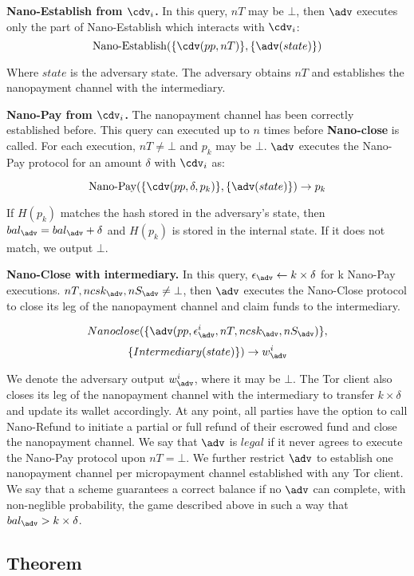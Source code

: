 \textbf{Nano-Establish from $\cdv_i$.}
In this query, $nT$ may be $\bot$, then $\adv$ executes only the part of Nano-Establish which interacts with $\cdv_i$: $$\operatorname{Nano-Establish}(\{\cdv(pp, nT)\}, \{\adv(state)\})$$

Where $state$ is the adversary state.
The adversary obtains $nT$ and establishes the nanopayment channel with the intermediary.

\textbf{Nano-Pay from $\cdv_i$.}
The nanopayment channel has been correctly established before.
This query can executed up to $n$ times before \textbf{Nano-close} is called.
For each execution, $nT \neq \bot$ and $p_k$ may be $\bot$.
$\adv$ executes the Nano-Pay protocol for an amount $\delta$ with $\cdv_i$ as:

$$\operatorname{Nano-Pay}(\{\cdv(pp,\delta,p_k)\},\{\adv(state)\}) \rightarrow p_k$$

If $H(p_k)$ matches the hash stored in the adversary's state, then $bal_\adv = bal_\adv+\delta$ and $H(p_k)$ is stored in the internal state.
If it does not match, we output $\bot$.

\textbf{Nano-Close with intermediary.}
In this query, $\epsilon_\adv \leftarrow k \times \delta$ for k Nano-Pay executions.
$nT, ncsk_\adv, nS_\adv \neq \bot$, then $\adv$ executes the Nano-Close protocol to close its leg of the nanopayment channel and claim funds to the intermediary.

$$Nano\-close(\{\adv(pp, \epsilon^i_\adv, nT, ncsk_\adv, nS_\adv)\},$$ $$\{Intermediary(state)\}) \rightarrow w^i_\adv$$

We denote the adversary output $w^i_\adv$, where it may be $\bot$.
The Tor client also closes its leg of the nanopayment channel with the intermediary to transfer $k \times \delta$ and update its wallet accordingly.
At any point, all parties have the option to call Nano-Refund to initiate a partial or full refund of their escrowed fund and close the nanopayment channel.
We say that $\adv$ is $legal$ if it never agrees to execute the Nano-Pay protocol upon $nT = \bot$.
We further restrict $\adv$ to establish one nanopayment channel per micropayment channel established with any Tor client.
We say that a scheme guarantees a correct balance if no $\adv$ can complete, with non-neglible probability, the game described above in such a way that $bal_\adv > k \times \delta$.

\subsection{Theorem}

